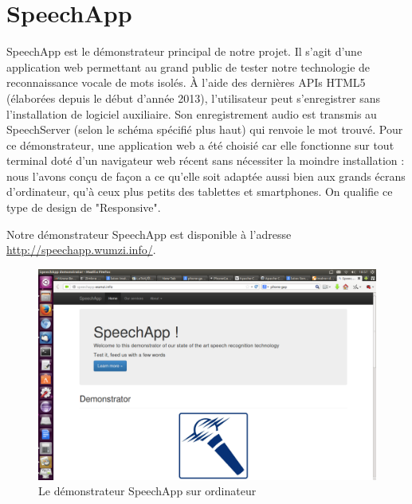 \documentclass[a4paper,12pt]{report}
\begin{document}
\section{SpeechApp}

SpeechApp est le démonstrateur principal de notre projet.
Il s'agit d'une application web permettant au grand public de tester notre technologie de reconnaissance vocale de mots isolés.
À l'aide des dernières APIs HTML5 (élaborées depuis le début d'année 2013), l'utilisateur peut s'enregistrer sans l'installation de logiciel auxiliaire. Son enregistrement audio est transmis au SpeechServer (selon le schéma spécifié plus haut) qui renvoie le mot trouvé.
\medskip{}
Pour ce démonstrateur, une application web a été choisié car elle fonctionne sur tout terminal doté d'un navigateur web récent sans nécessiter la moindre installation : nous l'avons conçu de façon a ce qu'elle soit adaptée aussi bien aux grands écrans d'ordinateur, qu'à ceux plus petits des tablettes et smartphones. On qualifie ce type de design de "Responsive".

\bigskip{}

Notre démonstrateur SpeechApp est disponible à l'adresse \url{http://speechapp.wumzi.info/}.


\begin{figure}[H]
	\begin{center}
	\includegraphics[width=14cm]{pics/speechapp-desktop.png} 
	\end{center}
	\caption{Le démonstrateur SpeechApp sur ordinateur}
\end{figure}
\end{document}
